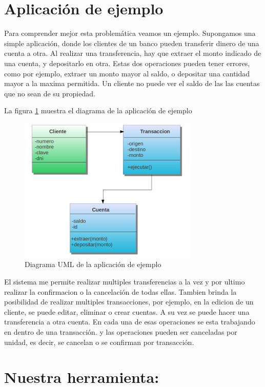 \section{Aplicación de ejemplo}

Para comprender mejor esta problemática veamos un ejemplo. Supongamos una simple
aplicación, donde los clientes de un banco pueden transferir dinero de
una cuenta a otra. Al realizar una transferencia, hay que extraer el monto
indicado de una cuenta, y depositarlo en otra. Estas dos
operaciones pueden tener errores, como por ejemplo, extraer un monto mayor al
saldo, o depositar una cantidad mayor a la maxima permitida. 
Un cliente no puede ver el saldo de las las cuentas que no sean de su propiedad.

La  figura \ref{example} muestra el diagrama de la aplicación de
ejemplo

	\begin{figure}[h]
		\includegraphics{img/objectTransaction}
		\caption{Diagrama UML de la aplicación de ejemplo}
		\label{example}
	\end{figure}	


El sistema me permite realizar multiples transferencias a la vez y por ultimo
realizar la confirmacion o la cancelación de todas ellas. Tambien brinda la posibilidad
de realizar multiples transacciones, por ejemplo, en la edicion de un cliente,
se puede editar, eliminar o crear cuentas. A su vez se puede hacer una
transferencia a otra cuenta. En cada una de esas operaciones se esta
trabajando en dentro de una transacción. y las operaciones pueden ser
canceladas por unidad, es decir, se cancelan o se confirman por transacción.



\section{Nuestra herramienta: }

